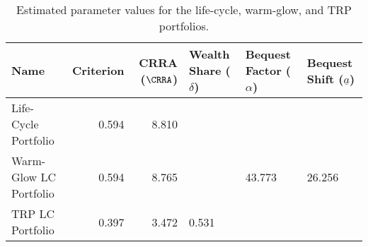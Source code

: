 \begin{table}\centering
    \begin{tabular}{lrrlll}
        \toprule
        Name                   & Criterion & CRRA ($\CRRA$) & Wealth Share ($\delta$) & Bequest Factor ($\alpha$) & Bequest Shift ($\underline{a}$) \\
        \midrule
        Life-Cycle Portfolio   & 0.594     & 8.810          &                         &                           &                                 \\
        Warm-Glow LC Portfolio & 0.594     & 8.765          &                         & 43.773                    & 26.256                          \\
        TRP LC Portfolio       & 0.397     & 3.472          & 0.531                   &                           &                                 \\
        \bottomrule
    \end{tabular}
    \caption{Estimated parameter values for the life-cycle, warm-glow, and TRP portfolios.}
    \label{parameters}
\end{table}